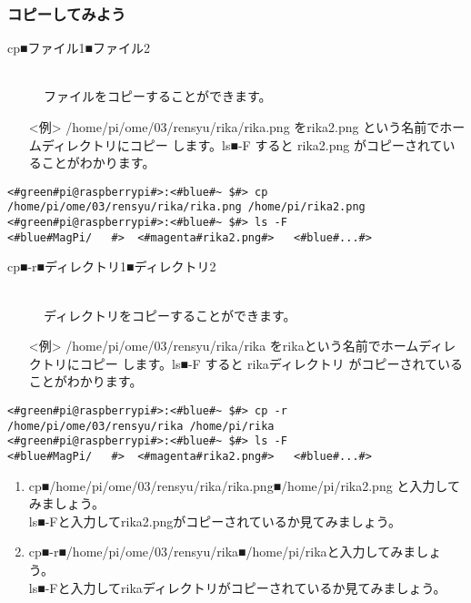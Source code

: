 \subsubsection{コピーしてみよう}
\begin{description}
\item[cp■ファイル1■ファイル2]\mbox{}\\
ファイルをコピーすることができます。
\end{description}
\begin{itemize}
\item[<例>]/home/pi/ome/03/rensyu/rika/rika.png をrika2.png という名前でホームディレクトリにコピー
します。ls■-F すると rika2.png がコピーされていることがわかります。
\end{itemize}
\begin{lstlisting}[caption=cpの例, label=cp]
<#green#pi@raspberrypi#>:<#blue#~ $#> cp /home/pi/ome/03/rensyu/rika/rika.png /home/pi/rika2.png
<#green#pi@raspberrypi#>:<#blue#~ $#> ls -F
<#blue#MagPi/	#>	<#magenta#rika2.png#>	<#blue#...#>
\end{lstlisting}
\begin{description}
\item[cp■-r■ディレクトリ1■ディレクトリ2]\mbox{}\\
ディレクトリをコピーすることができます。
\end{description}
\begin{itemize}
\item[<例>]/home/pi/ome/03/rensyu/rika/rika をrikaという名前でホームディレクトリにコピー
します。ls■-F すると rikaディレクトリ がコピーされていることがわかります。
\end{itemize}
\begin{lstlisting}[caption=cp -rの例, label=cp-R]
<#green#pi@raspberrypi#>:<#blue#~ $#> cp -r /home/pi/ome/03/rensyu/rika /home/pi/rika
<#green#pi@raspberrypi#>:<#blue#~ $#> ls -F
<#blue#MagPi/	#>	<#magenta#rika2.png#>	<#blue#...#>
\end{lstlisting}
\begin{tcolorbox}[title=\useOmetoi]
\begin{enumerate}
\item cp■/home/pi/ome/03/rensyu/rika/rika.png■/home/pi/rika2.png と入力してみましょう。\\ls■-Fと入力してrika2.pngがコピーされているか見てみましょう。\\
\item cp■-r■/home/pi/ome/03/rensyu/rika■/home/pi/rikaと入力してみましょう。\\ls■-Fと入力してrikaディレクトリがコピーされているか見てみましょう。\\
\end{enumerate}
\end{tcolorbox}

